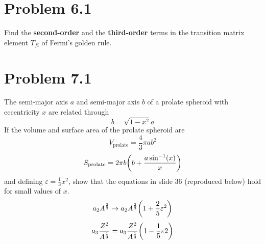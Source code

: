 \documentclass[12pt,a4paper]{article}
\begin{document}
	
	\section*{
		Problem 6.1
	}
	\begin{problem}
		Find the \textbf{second-order} and the \textbf{third-order} terms in the 
		transition matrix element $T_{fi}$ of Fermi's golden rule.
	\end{problem}
	\begin{solution_pset}

	\end{solution_pset}
	\newpage

	\section*{
		Problem 7.1
	}
	\begin{problem}
		The semi-major axis $a$ and semi-major axis $b$ of a prolate spheroid
		with eccentricity $x$ are related through
		\begin{equation}
			\label{eq:prolate-relation}
			b = \sqrt{1-x^2}a
		\end{equation}
		If the volume and surface area of the prolate spheroid are
		\begin{equation}
			\label{eq:v-prolate}
			V_\text{prolate}
			=
			\frac{4}{3}\pi ab^2 
		\end{equation}
		\begin{equation}
			\label{eq:s-prolate}
			S_\text{prolate}
		    =
			2\pi b \pqty{
				b + \frac{
					a \sin\inv(x)
				}{x} 
			}
		\end{equation}
		and defining $\displaystyle \varepsilon =\frac{1}{3} x^2$, show that the equations in slide
		36 (reproduced below) hold for small values of $x$.
		\begin{equation}
			\label{eq:a2-term}
			a_2 A^{\frac{2}{3}} \to a_2 A^\frac{2}{3} \pqty{
				1 + \frac{2}{5} \varepsilon^2
			} 
		\end{equation}
		\begin{equation}
			\label{eq:a3-term}
			a_3 \frac{Z^2}{A^\frac{1}{3}} 
			=
			a_3 \frac{Z^2}{A^\frac{1}{3}} 
			\pqty{
				1 - \frac{1}{5}
				\varepsilon{2}
			}
		\end{equation}
	\end{problem}
	\begin{solution_pset}
		
	\end{solution_pset}
	\newpage
\end{document}
